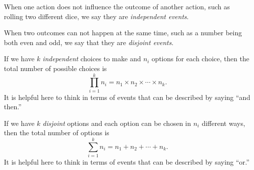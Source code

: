 
\begin{defn}
    When one action does not influence the outcome of another action, such as rolling two different dice, we say they are \emph{independent events}.
\end{defn}

\begin{defn}
    When two outcomes can not happen at the same time, such as a number being both even and odd, we say that they are \emph{disjoint events}.
\end{defn}

\begin{defn}
    If we have \(k\) \emph{independent} choices to make and \(n_i\) options for each choice, then the total number of possible choices is
        \[\prod_{i=1}^kn_i=n_1\times n_2\times\cdots\times n_k.\]
    It is helpful here to think in terms of events that can be described by saying ``and then.''
\end{defn}

\begin{defn}
    If we have \(k\) \emph{disjoint} options and each option can be chosen in \(n_i\) different ways, then the total number of options is
        \[\sum_{i=1}^{k}n_i=n_1+n_2+\cdots+n_k.\]
    It is helpful here to think in terms of events that can be described by saying ``or.''
\end{defn}

\clearpage


